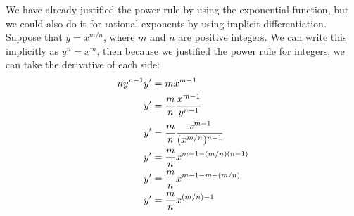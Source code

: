 \begin{example} We have already justified the power rule by
using the exponential function, but we could also do it for rational
exponents by using implicit differentiation.  Suppose that
$y=x^{m/n}$, where $m$ and $n$ are positive integers. We can write
this implicitly as $y^n=x^m$, then because we justified the power rule
for integers, we can take the derivative of each side:
\begin{align*}
ny^{n-1}y' &= mx^{m-1} \\
y'&= {m\over n}{x^{m-1}\over y^{n-1}} \\
y'&= {m\over n}{x^{m-1}\over (x^{m/n})^{n-1}} \\
y'&= {m\over n}x^{m-1-(m/n)(n-1)} \\
y'&= {m\over n}x^{m-1-m+(m/n)} \\
y'&= {m\over n}x^{(m/n)-1} \\
\end{align*}
\end{example}

